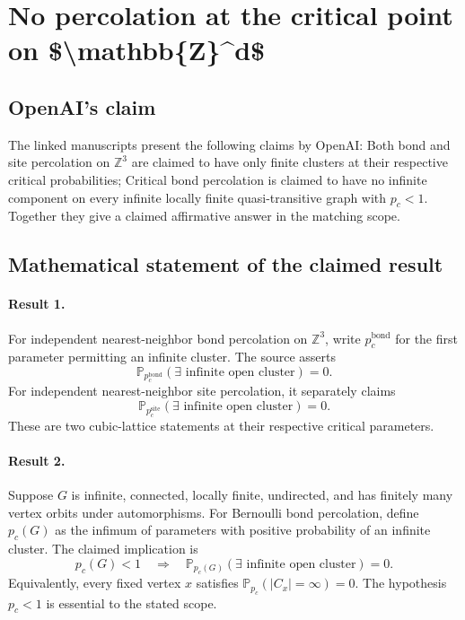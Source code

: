 \documentclass[11pt]{article}
\begin{document}
\section*{No percolation at the critical point on \$\textbackslash{}mathbb\{Z\}\textasciicircum{}d\$}

\subsection{OpenAI's claim}
The linked manuscripts present the following claims by OpenAI: Both bond and site percolation on $\mathbb Z^3$ are claimed to have only finite clusters at their respective critical probabilities; Critical bond percolation is claimed to have no infinite component on every infinite locally finite quasi-transitive graph with $p_c<1$. Together they give a claimed affirmative answer in the matching scope.

\subsection{Mathematical statement of the claimed result}
\paragraph{Result 1.} For independent nearest-neighbor bond percolation on \(\mathbb Z^3\), write \(p_c^{\mathrm{bond}}\) for the first parameter permitting an infinite cluster. The source asserts
\[
 \mathbb P_{p_c^{\mathrm{bond}}}(\exists\text{ infinite open cluster})=0.
\]
For independent nearest-neighbor site percolation, it separately claims
\[
 \mathbb P_{p_c^{\mathrm{site}}}(\exists\text{ infinite open cluster})=0.
\]
These are two cubic-lattice statements at their respective critical parameters.

\paragraph{Result 2.} Suppose \(G\) is infinite, connected, locally finite, undirected, and has finitely many vertex orbits under automorphisms. For Bernoulli bond percolation, define \(p_c(G)\) as the infimum of parameters with positive probability of an infinite cluster. The claimed implication is
\[
 p_c(G)<1\quad\Longrightarrow\quad
 \mathbb P_{p_c(G)}(\exists\text{ infinite open cluster})=0.
\]
Equivalently, every fixed vertex \(x\) satisfies \(\mathbb P_{p_c}(|C_x|=\infty)=0\). The hypothesis \(p_c<1\) is essential to the stated scope.
\end{document}
